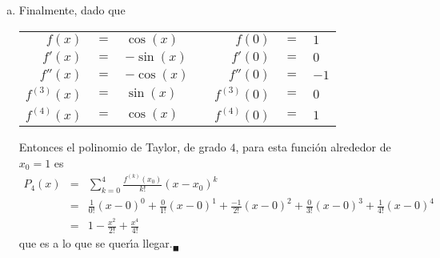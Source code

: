 \begin{solucion}
\begin{enumerate}[(a)]
  \item Finalmente, dado que
  \begin{center}
   \begin{tabular}{rclcrcl}
    $f(x)$ & $=$ & $\cos(x)$ & \hspace{2cm} & $f(0)$ & $=$ & $1$ \\
    $f'(x)$ & $=$ & $-\sin(x)$ & & $f'(0)$ & $=$ & $0$ \\
    $f''(x)$ & $=$ & $-\cos(x)$ & & $f''(0)$ & $=$ & $-1$ \\
    $f^{(3)}(x)$ & $=$ & $\sin(x)$ & & $f^{(3)}(0)$ & $=$ & $0$ \\
    $f^{(4)}(x)$ & $=$ & $\cos(x)$ & & $f^{(4)}(0)$ & $=$ & $1$
   \end{tabular}
  \end{center}
  Entonces el polinomio de Taylor, de grado $4$, para esta funci\'on alrededor de $x_0 = 1$ es
  \begin{eqnarray*}
   P_4(x) & = & \sum_{k=0}^{4} \frac{f^{(k)}(x_0)}{k!}(x-x_0)^k \\
   & = & \frac{1}{0!}(x-0)^0 + \frac{0}{1!}(x-0)^1 + \frac{-1}{2!}(x-0)^2 + \frac{0}{3!}(x-0)^3 + \frac{1}{4!}(x-0)^4 \\
   & = & 1 - \frac{x^2}{2!} + \frac{x^4}{4!}
  \end{eqnarray*}
  que es a lo que se quer\'{\i}a llegar.${}_{\blacksquare}$
 \end{enumerate}
\end{solucion}
